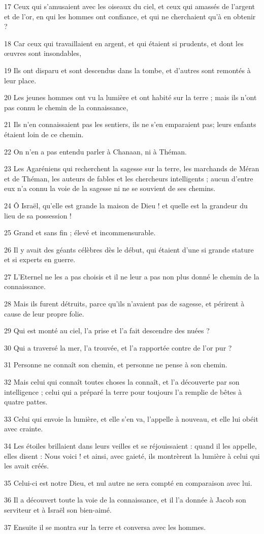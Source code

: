 \par 17 Ceux qui s'amusaient avec les oiseaux du ciel, et ceux qui amassés de l'argent et de l'or, en qui les hommes ont confiance, et qui ne cherchaient qu'à en obtenir ?
\par 18 Car ceux qui travaillaient en argent, et qui étaient si prudents, et dont les œuvres sont insondables,
\par 19 Ils ont disparu et sont descendus dans la tombe, et d'autres sont remontés à leur place.
\par 20 Les jeunes hommes ont vu la lumière et ont habité sur la terre ; mais ils n'ont pas connu le chemin de la connaissance,
\par 21 Ils n'en connaissaient pas les sentiers, ils ne s'en emparaient pas; leurs enfants étaient loin de ce chemin.
\par 22 On n'en a pas entendu parler à Chanaan, ni à Théman.
\par 23 Les Agaréniens qui recherchent la sagesse sur la terre, les marchands de Méran et de Théman, les auteurs de fables et les chercheurs intelligents ; aucun d’entre eux n’a connu la voie de la sagesse ni ne se souvient de ses chemins.
\par 24 Ô Israël, qu'elle est grande la maison de Dieu ! et quelle est la grandeur du lieu de sa possession !
\par 25 Grand et sans fin ; élevé et incommensurable.
\par 26 Il y avait des géants célèbres dès le début, qui étaient d'une si grande stature et si experts en guerre.
\par 27 L'Eternel ne les a pas choisis et il ne leur a pas non plus donné le chemin de la connaissance.
\par 28 Mais ils furent détruits, parce qu'ils n'avaient pas de sagesse, et périrent à cause de leur propre folie.
\par 29 Qui est monté au ciel, l'a prise et l'a fait descendre des nuées ?
\par 30 Qui a traversé la mer, l'a trouvée, et l'a rapportée contre de l'or pur ?
\par 31 Personne ne connaît son chemin, et personne ne pense à son chemin.
\par 32 Mais celui qui connaît toutes choses la connaît, et l'a découverte par son intelligence ; celui qui a préparé la terre pour toujours l'a remplie de bêtes à quatre pattes.
\par 33 Celui qui envoie la lumière, et elle s'en va, l'appelle à nouveau, et elle lui obéit avec crainte.
\par 34 Les étoiles brillaient dans leurs veilles et se réjouissaient : quand il les appelle, elles disent : Nous voici ! et ainsi, avec gaieté, ils montrèrent la lumière à celui qui les avait créés.
\par 35 Celui-ci est notre Dieu, et nul autre ne sera compté en comparaison avec lui.
\par 36 Il a découvert toute la voie de la connaissance, et il l'a donnée à Jacob son serviteur et à Israël son bien-aimé.
\par 37 Ensuite il se montra sur la terre et conversa avec les hommes.

